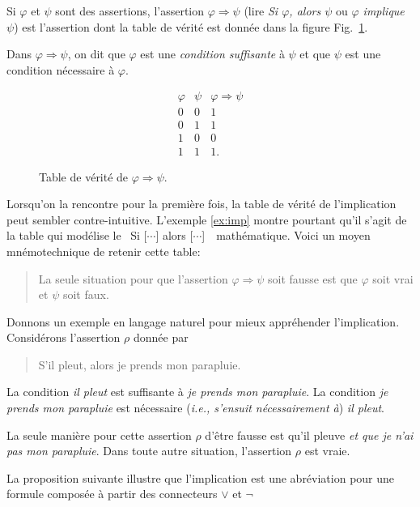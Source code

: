 \documentclass[french,course,oneside,theoremnosection]{lecture}
\newcommand{\iimplies}{\Rightarrow}
\begin{document}
\begin{definition}
Si $\varphi$ et $\psi$ sont des assertions, l'assertion $\varphi \iimplies \psi$ (lire \emph{Si $\varphi$, alors $\psi$} ou \emph{$\varphi$ implique $\psi$}) est l'assertion dont la table de vérité est donnée dans la figure Fig.~\ref{fig:imp}. 

Dans $\varphi \iimplies \psi$, on dit que $\varphi$ est une \emph{condition suffisante} à $\psi$ et que $\psi$ est une condition nécessaire à $\varphi.$
\begin{figure}
\[
\begin{array}{c|c||c}
\varphi & \psi & \varphi \iimplies \psi\\\hline
0 & 0 & 1\\
0 & 1 & 1\\
1 & 0 & 0\\
1 & 1 & 1.
\end{array}
\]
\caption{Table de vérité de $\varphi \iimplies \psi$.}\label{fig:imp}
\end{figure}
\end{definition}

Lorsqu'on la rencontre pour la première fois, la table de vérité de l'implication peut sembler contre-intuitive. L'exemple \ref{ex:imp} montre pourtant qu'il s'agit de la table qui modélise le \og~Si [$\cdots$] alors [$\cdots$]~\fg{}~mathématique. Voici un moyen mnémotechnique de retenir cette table:
\begin{quotation}
La seule situation pour que l'assertion $\varphi \iimplies \psi$ soit fausse est que $\varphi$ soit vrai et $\psi$ soit faux. 
\end{quotation}

\begin{example}
Donnons un exemple en langage naturel pour mieux appréhender l'implication. Considérons l'assertion $\rho$ donnée par
\begin{quotation}
S'il pleut, alors je prends mon parapluie.
\end{quotation}
La condition \emph{il pleut} est suffisante à \emph{je prends mon parapluie}. La condition \emph{je prends mon parapluie} est nécessaire (\emph{i.e., s'ensuit nécessairement à}) \emph{il pleut}.

La seule manière pour cette assertion $\rho$ d'être fausse est qu'il pleuve \emph{et que je n'ai pas mon parapluie}. Dans toute autre situation, l'assertion $\rho$ est vraie.
\end{example}

La proposition suivante illustre que l'implication est une abréviation pour une formule composée à partir des connecteurs $\vee$ et $\neg$
\end{document}
